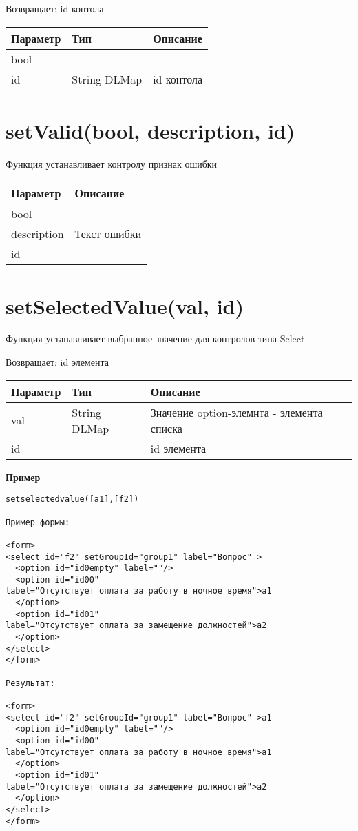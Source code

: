 Возвращает: id контола

\begin{longtable}[]{@{}lll@{}}
\toprule
Параметр & Тип & Описание\tabularnewline
\midrule
\endhead
bool & &\tabularnewline
id & String \textbar{} DLMap & id контола\tabularnewline
\bottomrule
\end{longtable}

\hypertarget{setvalidbool-description-id}{%
\section{setValid(bool, description,
id)}\label{setvalidbool-description-id}}

Функция устанавливает контролу признак ошибки


\begin{longtable}[]{@{}ll@{}}
\toprule
Параметр & Описание\tabularnewline
\midrule
\endhead
bool &\tabularnewline
description & Текст ошибки\tabularnewline
id &\tabularnewline
\bottomrule
\end{longtable}

\hypertarget{setselectedvalueval-id}{%
\section{setSelectedValue(val, id)}\label{setselectedvalueval-id}}

Функция устанавливает выбранное значение для контролов типа Select

Возвращает: id элемента

\begin{longtable}[]{@{}lll@{}}
\toprule
Параметр & Тип & Описание\tabularnewline
\midrule
\endhead
val & String \textbar{} DLMap & Значение option-элемнта - элемента
списка\tabularnewline
id & & id элемента\tabularnewline
\bottomrule
\end{longtable}

\textbf{Пример}

\begin{verbatim}
setselectedvalue([a1],[f2])

Пример формы:

<form>
<select id="f2" setGroupId="group1" label="Вопрос" >
  <option id="id0empty" label=""/>
  <option id="id00" 
label="Отсутствует оплата за работу в ночное время">a1
  </option>
  <option id="id01" 
label="Отсутствует оплата за замещение должностей">a2
  </option>
</select>
</form>

Результат:

<form>
<select id="f2" setGroupId="group1" label="Вопрос" >a1
  <option id="id0empty" label=""/>
  <option id="id00" 
label="Отсутствует оплата за работу в ночное время">a1
  </option>
  <option id="id01" 
label="Отсутствует оплата за замещение должностей">a2
  </option>
</select>
</form>
\end{verbatim}

